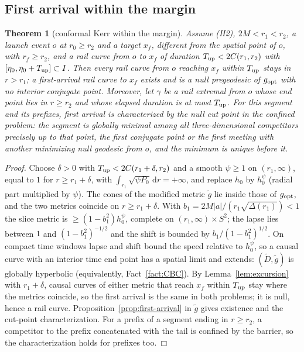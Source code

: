 \documentclass[aip,jmp,amsmath,amssymb,reprint]{revtex4-2}
\newcommand{\dd}{\mathrm{d}}
\newcommand{\gopt}{g_{\rm opt}}
\theoremstyle{plain}
\newtheorem{theorem}{Theorem}
\theoremstyle{definition}
\begin{document}
\subsection{First arrival within the margin}
\begin{theorem}[conformal Kerr within the margin]\label{thm:kerr}
Assume (H2), $2M<r_1<r_2$, a launch event $o$ at $r_0\ge r_2$ and a target $x_f$, different from the spatial point of $o$, with
$r_f\ge r_2$, and a rail curve from $o$ to $x_f$ of duration $T_{\rm up}<2C(r_1,r_2)$ with
$[\eta_0,\eta_0+T_{\rm up}]\subset I$. Then every rail curve from $o$ reaching $x_f$ within
$T_{\rm up}$ stays in $r>r_1$; a first-arrival rail curve to $x_f$ exists and is a null
pregeodesic of $\gopt$ with no interior conjugate point. Moreover, let $\gamma$ be a rail
extremal from $o$ whose end point lies in $r\ge r_2$ and whose elapsed duration is at most
$T_{\rm up}$. For this segment and its prefixes, first arrival is characterized by the null
cut point in the confined problem: the segment is globally minimal among all
three-dimensional competitors precisely up to that point, the first conjugate point or the
first meeting with another minimizing null geodesic from $o$, and the minimum is unique
before it.
\end{theorem}

\begin{proof}
Choose $\delta>0$ with $T_{\rm up}<2C(r_1+\delta,r_2)$ and a smooth $\psi\ge1$ on $(r_1,\infty)$,
equal to $1$ for $r\ge r_1+\delta$, with $\int_{r_1}\sqrt{\psi P_0}\,\dd r=+\infty$, and replace
$h_0$ by $h_0^\psi$ (radial part multiplied by $\psi$). The cones of the modified metric
$\tilde g$ lie inside those of $\gopt$, and the two metrics coincide on $r\ge r_1+\delta$. With
$b_1=2M|a|/(r_1\sqrt{\Delta(r_1)})<1$ the slice metric is $\ge(1-b_1^2)h_0^\psi$, complete on
$(r_1,\infty)\times S^2$; the lapse lies between $1$ and $(1-b_1^2)^{-1/2}$ and the shift is
bounded by $b_1/(1-b_1^2)^{1/2}$. On compact time windows lapse and shift bound the speed
relative to $h_0^\psi$, so a causal curve with an interior time end point has a spatial limit
and extends: $(\tilde D,\tilde g)$ is globally hyperbolic (equivalently,
Fact~\ref{fact:CBC}). By Lemma~\ref{lem:excursion} with $r_1+\delta$, causal curves of either
metric that reach $x_f$ within $T_{\rm up}$ stay where the metrics coincide, so the first
arrival is the same in both problems; it is null, hence a rail curve.
Proposition~\ref{prop:first-arrival} in $\tilde g$ gives existence and the cut-point
characterization. For a prefix of a segment ending in $r\ge r_2$, a competitor to the prefix
concatenated with the tail is confined by the barrier, so the characterization holds for
prefixes too.
\end{proof}
\end{document}
